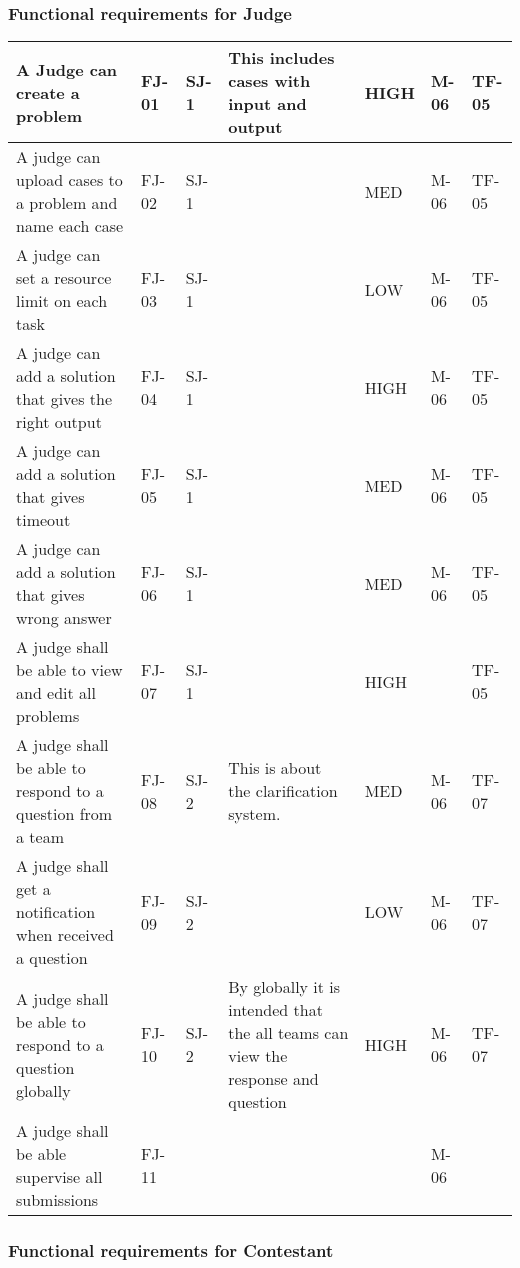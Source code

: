 \subsubsection{Functional requirements for Judge}
\begin{supertabular}{|p{2cm}|l|m{0.33795986in}|m{1.2684599in}|m{0.5254598in}|m{1.0983598in}|m{1.0566599in}|}
\hline
A Judge can create a problem & FJ-01 & SJ-1 & This includes cases with input
and output & HIGH & M-06 &
TF-05\\\hline

A judge can upload cases to a problem and name each case & FJ-02 & SJ-1 &
 & MED & M-06 & TF-05\\\hline

A judge can set a resource limit on each task & FJ-03 & SJ-1 & & LOW & M-06 &
TF-05\\
\hline

A judge can add a solution that gives the right output & FJ-04 & SJ-1 & & HIGH
& M-06 & TF-05\\
\hline

 A judge can add a solution that gives timeout & FJ-05 &
SJ-1 & & MED & M-06 & TF-05\\
\hline

 A judge can add a solution that gives wrong
answer & FJ-06 & SJ-1 & & MED & M-06 & TF-05\\
\hline

 A judge shall be able to
view and edit all problems & FJ-07 & SJ-1 & & HIGH & & TF-05\\
\hline

 A judge
shall be able to respond to a question from a team & FJ-08 & SJ-2 & This is
about the clarification system. & MED & M-06 & TF-07\\
\hline

 A judge shall get
a notification when received a question & FJ-09 & SJ-2 & & LOW & M-06 &
TF-07\\
\hline

 A judge shall be able to respond to a question globally & FJ-10 &
SJ-2 & By globally it is intended that the all teams can view the response and
question & HIGH & M-06 & TF-07\\
\hline

 A judge shall be able supervise all
submissions & FJ-11 & & & & M-06 & \\
\hline

 \end{supertabular}

\subsubsection{Functional requirements for Contestant}

